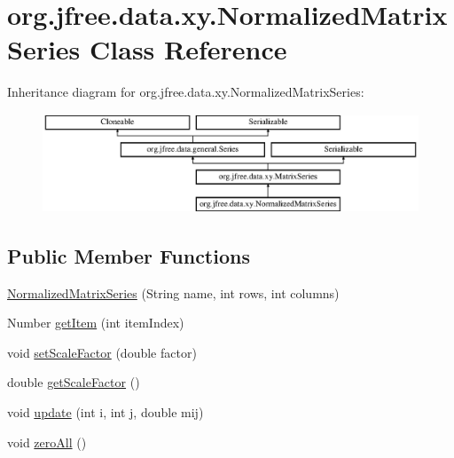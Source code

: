 \hypertarget{classorg_1_1jfree_1_1data_1_1xy_1_1_normalized_matrix_series}{}\section{org.\+jfree.\+data.\+xy.\+Normalized\+Matrix\+Series Class Reference}
\label{classorg_1_1jfree_1_1data_1_1xy_1_1_normalized_matrix_series}
Inheritance diagram for org.\+jfree.\+data.\+xy.\+Normalized\+Matrix\+Series\+:\begin{figure}[H]
\begin{center}
\leavevmode
\includegraphics[height=2.962963cm]{classorg_1_1jfree_1_1data_1_1xy_1_1_normalized_matrix_series}
\end{center}
\end{figure}
\subsection*{Public Member Functions}
\begin{DoxyCompactItemize}
\item 
\mbox{\hyperlink{classorg_1_1jfree_1_1data_1_1xy_1_1_normalized_matrix_series_a810e10876f0478ec31b689c161039ea7}{Normalized\+Matrix\+Series}} (String name, int rows, int columns)
\item 
Number \mbox{\hyperlink{classorg_1_1jfree_1_1data_1_1xy_1_1_normalized_matrix_series_a852cbf8ee5661aeff789ad881f1dfc0b}{get\+Item}} (int item\+Index)
\item 
void \mbox{\hyperlink{classorg_1_1jfree_1_1data_1_1xy_1_1_normalized_matrix_series_acf250534ea1cda57df4cafd7fed86529}{set\+Scale\+Factor}} (double factor)
\item 
double \mbox{\hyperlink{classorg_1_1jfree_1_1data_1_1xy_1_1_normalized_matrix_series_aa2b37e1c9b471985728aeb8c0ba48b1a}{get\+Scale\+Factor}} ()
\item 
void \mbox{\hyperlink{classorg_1_1jfree_1_1data_1_1xy_1_1_normalized_matrix_series_aaac2eb4602491630c87f728fb6480cfe}{update}} (int i, int j, double mij)
\item 
void \mbox{\hyperlink{classorg_1_1jfree_1_1data_1_1xy_1_1_normalized_matrix_series_a5c6c19241454aaf2d536a2f581b48edf}{zero\+All}} ()
\end{DoxyCompactItemize}
